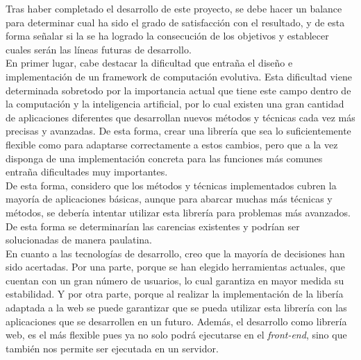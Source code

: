 

Tras haber completado el desarrollo de este proyecto, se debe hacer un balance para determinar cual ha sido el grado de satisfacción con el resultado, y de esta forma señalar si la se ha logrado la consecución de los objetivos y establecer cuales serán las líneas futuras de desarrollo.  \\

En primer lugar, cabe destacar la dificultad que entraña el diseño e implementación de un framework de computación evolutiva. Esta dificultad viene determinada sobretodo por la importancia actual que tiene este campo dentro de la computación y la inteligencia artificial, por lo cual existen una gran cantidad de aplicaciones diferentes que desarrollan nuevos métodos y técnicas cada vez más precisas y avanzadas. De esta forma, crear una librería que sea lo suficientemente flexible como para adaptarse correctamente a estos cambios, pero que a la vez disponga de una implementación concreta para las funciones más comunes entraña dificultades muy importantes. \\

De esta forma, considero que los métodos y técnicas implementados cubren la mayoría de aplicaciones básicas, aunque para abarcar muchas más técnicas y métodos, se debería intentar utilizar esta librería para problemas más avanzados. De esta forma se determinarían las carencias existentes y podrían ser solucionadas de manera paulatina. \\

En cuanto a las tecnologías de desarrollo, creo que la mayoría de decisiones han sido acertadas. Por una parte, porque se han elegido herramientas actuales, que cuentan con un gran número de usuarios, lo cual garantiza en mayor medida su estabilidad. Y por otra parte, porque al realizar la implementación de la libería adaptada a la web se puede garantizar que se pueda utilizar esta librería con las aplicaciones que se desarrollen en un futuro. Además, el desarrollo como librería web, es el más flexible pues ya no solo podrá ejecutarse en el \textit{front-end}, sino que también nos permite ser ejecutada en un servidor. \\

